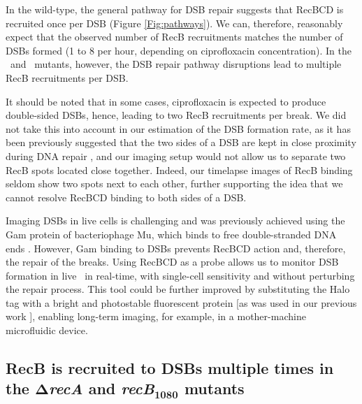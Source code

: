 In the wild-type, the general pathway for DSB repair suggests that RecBCD is recruited once per DSB (Figure \ref{Fig:pathways}). We can, therefore, reasonably expect that the observed number of RecB recruitments matches the number of DSBs formed (1 to 8 per hour, depending on ciprofloxacin concentration). In the \dreca\ and \geneteneighty\ mutants, however, the DSB repair pathway disruptions lead to multiple RecB recruitments per DSB.

It should be noted that in some cases, ciprofloxacin is expected to produce double-sided DSBs, hence, leading to two RecB recruitments per break. We did not take this into account in our estimation of the DSB formation rate, as it has been previously suggested that the two sides of a DSB are kept in close proximity during DNA repair \cite{Vickridge2017,Keyamura2019}, and our imaging setup would not allow us to separate two RecB spots located close together. Indeed, our timelapse images of RecB binding seldom show two spots next to each other, further supporting the idea that we cannot resolve RecBCD binding to both sides of a DSB.

Imaging DSBs in live cells is challenging and was previously achieved using the Gam protein of bacteriophage Mu, which binds to free double-stranded DNA ends \cite{Shee2013}. However, Gam binding to DSBs prevents RecBCD action and, therefore, the repair of the breaks. Using RecBCD as a probe allows us to monitor DSB formation in live \ecoli\ in real-time, with single-cell sensitivity and without perturbing the repair process. This tool could be further improved by substituting the Halo tag with a bright and photostable fluorescent protein [as was used in our previous work \cite{Lepore2019a}], enabling long-term imaging, for example, in a mother-machine microfluidic device.

\subsection*{RecB is recruited to DSBs multiple times in the $\mathbf{\Delta}$\emph{recA} and \emph{recB}$\mathbf{_{1080}}$ mutants}

